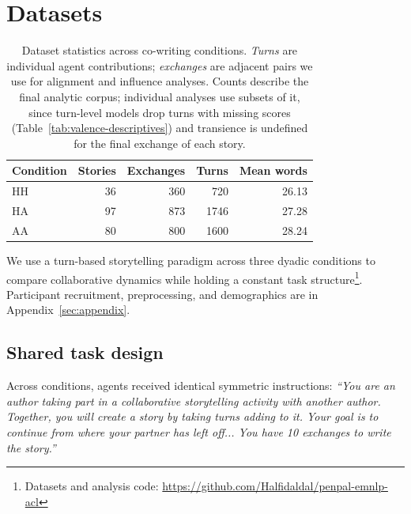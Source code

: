 \documentclass[11pt]{article}
\begin{document}

\section{Datasets}


\begin{table}[t]
\centering
\small
\setlength{\tabcolsep}{3pt}
\begin{tabular}{@{}lrrrr@{}}
\toprule
Condition & Stories & Exchanges & Turns & Mean words \\
\midrule
HH & 36 & 360 & 720 & 26.13 \\
HA & 97 & 873 & 1746 & 27.28 \\
AA & 80 & 800 & 1600 & 28.24 \\
\bottomrule
\end{tabular}
\caption{Dataset statistics across co-writing conditions. \textit{Turns} are individual agent contributions; \textit{exchanges} are adjacent pairs we use for alignment and influence analyses. Counts describe the final analytic corpus; individual analyses use subsets of it, since turn-level models drop turns with missing scores (Table~\ref{tab:valence-descriptives}) and transience is undefined for the final exchange of each story.}
\label{tab:dataset}
\end{table}

We use a turn-based storytelling paradigm across three dyadic conditions to compare collaborative dynamics while holding a constant task structure\footnote{Datasets and analysis code: \url{https://github.com/Halfidaldal/penpal-emnlp-acl}}. %
Participant recruitment, preprocessing, and demographics are in Appendix~\ref{sec:appendix}.

\subsection{Shared task design}
Across conditions, agents received identical symmetric instructions:
\textit{“You are an author taking part in a collaborative storytelling activity with another author. Together, you will create a story by taking turns adding to it. Your goal is to continue from where your partner has left off... You have 10 exchanges to write the story.”} 
\end{document}
